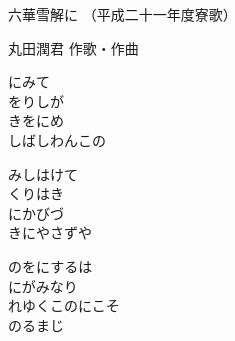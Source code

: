 \documentclass[10pt,b5j]{tarticle} %
\begin{document}
\begin{minipage}[c]{0.7\hsize} %
    \begin{center}
        {\LARGE
            六華雪解に %
        }
        {\small 
            （平成二十一年度寮歌） %
        }
    \end{center}
\end{minipage}
\begin{minipage}[c]{0.3\hsize} %
    \begin{flushright} %
        丸田潤君 作歌・作曲 %
    \end{flushright}
\end{minipage}

\vspace{1.5em} %
\newcommand{\linespace}{0.5em} %
\newcommand{\blocksize}{0.5\hsize} %
\begin{enumerate} %
    \begin{minipage}[c]{\blocksize}
    
        \vspace{\linespace}
        \item
        にみて\\
        をりしが\\
        きをにめ\\
        しばしわんこの
        
        \vspace{\linespace}
        \item
        みしはけて\\
        くりはき\\
        にかびづ\\
        きにやさずや
        
        \vspace{\linespace}
        \item
        のをにするは\\
        にがみなり\\
        れゆくこのにこそ\\
        のるまじ
    
    \end{minipage}
\end{enumerate} %
\end{document}
